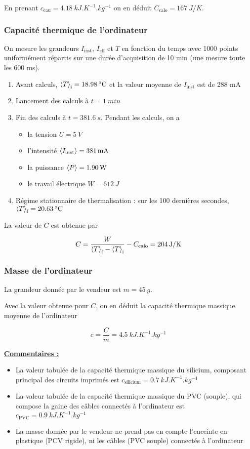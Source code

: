 \documentclass[french]{article}
\newcommand{\cel}{\degreeCelsius}
\newcommand{\moy}{\expval}
\begin{document}
En prenant $c_{\text{eau}} = \SI{4,18}{kJ.K^{-1}.kg^{-1}}$ on en déduit $C_{\text{calo}} = \SI{167}{J/K}$.

\subsubsection{Capacité thermique de l'ordinateur}

On mesure les grandeurs $I_{\text{inst}}$, $I_{\text{eff}}$ et $T$ en fonction du temps avec 1000 points uniformément répartis sur une durée d'acquisition de 10 min (une mesure toute les 600 ms).
\begin{enumerate}
    \item Avant calculs, $\moy{T}_\text{i} = \SI{18,98}{\cel}$ et la valeur moyenne de $I_{\text{inst}}$ est de 288 mA
    \item Lancement des calculs à $t = \SI{1}{min}$
    \item Fin des calculs à $t = \SI{381,6}{s}$. Pendant les calculs, on a
    \begin{itemize}
        \item la tension $U = \SI{5}{V}$
        \item l'intensité $\moy{I_{\text{inst}}} = \SI{381}{mA}$
        \item la puissance $\moy{P} = \SI{1,90}{W}$
        \item le travail électrique $W = \SI{612}{J}$
    \end{itemize}
    \item Régime stationnaire de thermalisation : sur les 100 dernières secondes, $\moy{T}_\text{f} = \SI{20,63}{\cel}$
\end{enumerate}

La valeur de $C$ est obtenue par

$$C = \frac{W}{\moy{T}_\text{f} - \moy{T}_\text{i}} - C_{\text{calo}} = \SI{204}{J/K}$$

\subsubsection{Masse de l'ordinateur}

La grandeur donnée par le vendeur est $m = \SI{45}{g}$.

Avec la valeur obtenue pour $C$, on en déduit la capacité thermique massique moyenne de l'ordinateur

$$c = \frac{C}{m} = \SI{4,5}{kJ.K^{-1}.kg^{-1}}$$

\underline{\textbf{Commentaires :}}
\begin{itemize}
    \item La valeur tabulée de la capacité thermique massique du silicium, composant principal des circuits imprimés est $c_\text{silicium} = \SI{0,7}{kJ.K^{-1}.kg^{-1}}$
    \item La valeur tabulée de la capacité thermique massique du PVC (souple), qui compose la gaine des câbles connectés à l'ordinateur est $c_\text{PVC} = \SI{0,9}{kJ.K^{-1}.kg^{-1}}$
    \item La masse donnée par le vendeur ne prend pas en compte l'enceinte en plastique (PCV rigide), ni les câbles (PVC souple) connectés à l'ordinateur
\end{itemize}
\end{document}
